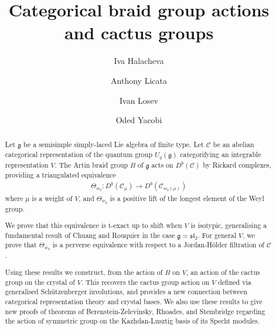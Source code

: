 \documentclass[11pt,reqno]{amsart}
\numberwithin{equation}{section}
\theoremstyle{definition}
\theoremstyle{named}
\newcommand{\cC}{\mathcal{C}}
\newcommand{\fg}{\mathfrak{g}}
\newcommand{\fsl}{\mathfrak{sl}}
\begin{document}
\title[Categorical braid group actions and cactus groups]{Categorical braid group actions \\ and cactus groups}
\author{Iva Halacheva}
\address{I.~Halacheva: Department of Mathematics, Northeastern University, USA}

\author{Anthony Licata}
\address{A.~Licata: Mathematical Sciences Institute, Australian National University, Australia}

\author{Ivan Losev}
\address{I.~Losev: Department of Mathematics, Yale University, and School of Mathematics, IAS, USA}

\author{Oded Yacobi}
\address{O.~Yacobi: School of Mathematics and Statistics, University of Sydney, Australia}
\date{}
\maketitle

\begin{abstract}
Let $\fg$ be a semisimple simply-laced Lie algebra of finite type.  Let $\cC$ be an abelian categorical representation of the quantum group $U_q(\fg)$ categorifying an integrable representation $V$.  
The Artin braid group $B$ of $\fg$ acts on $D^b(\cC)$ by Rickard complexes, providing a triangulated equivalence 
\begin{align*}
\Theta_{w_0}:D^b(\cC_\mu) \to D^b(\cC_{w_0(\mu)})
\end{align*}
where $\mu$ is a weight of $V$, and $\Theta_{w_0}$ is a positive lift of the longest element of the Weyl group.  

We prove that this equivalence is t-exact up to shift when $V$ is isotypic, generalising a fundamental result of Chuang and Rouquier in the case $\fg=\fsl_2$.
For general $V$, we prove that $\Theta_{w_0}$ is a perverse equivalence with respect to a Jordan-H\"older filtration of $\cC$.  

Using these results we construct, from the action of 
$B$ on $V$, an action of the cactus group on the crystal of $V$.  This recovers the  cactus group action on $V$ defined via generalised Sch\"utzenberger involutions, and  provides a new connection between categorical representation theory and crystal bases.
We also use these results to give new  proofs of theorems of Berenstein-Zelevinsky, Rhoades, and Stembridge regarding the action of symmetric group on the Kazhdan-Lusztig basis of its Specht modules.  
\end{abstract}
\end{document}
